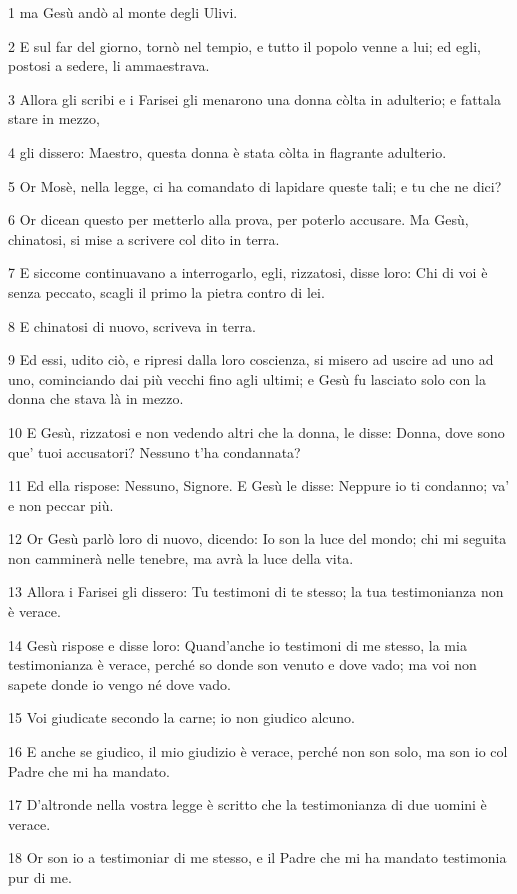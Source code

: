 \par 1 ma Gesù andò al monte degli Ulivi.
\par 2 E sul far del giorno, tornò nel tempio, e tutto il popolo venne a lui; ed egli, postosi a sedere, li ammaestrava.
\par 3 Allora gli scribi e i Farisei gli menarono una donna còlta in adulterio; e fattala stare in mezzo,
\par 4 gli dissero: Maestro, questa donna è stata còlta in flagrante adulterio.
\par 5 Or Mosè, nella legge, ci ha comandato di lapidare queste tali; e tu che ne dici?
\par 6 Or dicean questo per metterlo alla prova, per poterlo accusare. Ma Gesù, chinatosi, si mise a scrivere col dito in terra.
\par 7 E siccome continuavano a interrogarlo, egli, rizzatosi, disse loro: Chi di voi è senza peccato, scagli il primo la pietra contro di lei.
\par 8 E chinatosi di nuovo, scriveva in terra.
\par 9 Ed essi, udito ciò, e ripresi dalla loro coscienza, si misero ad uscire ad uno ad uno, cominciando dai più vecchi fino agli ultimi; e Gesù fu lasciato solo con la donna che stava là in mezzo.
\par 10 E Gesù, rizzatosi e non vedendo altri che la donna, le disse: Donna, dove sono que' tuoi accusatori? Nessuno t'ha condannata?
\par 11 Ed ella rispose: Nessuno, Signore. E Gesù le disse: Neppure io ti condanno; va' e non peccar più.
\par 12 Or Gesù parlò loro di nuovo, dicendo: Io son la luce del mondo; chi mi seguita non camminerà nelle tenebre, ma avrà la luce della vita.
\par 13 Allora i Farisei gli dissero: Tu testimoni di te stesso; la tua testimonianza non è verace.
\par 14 Gesù rispose e disse loro: Quand'anche io testimoni di me stesso, la mia testimonianza è verace, perché so donde son venuto e dove vado; ma voi non sapete donde io vengo né dove vado.
\par 15 Voi giudicate secondo la carne; io non giudico alcuno.
\par 16 E anche se giudico, il mio giudizio è verace, perché non son solo, ma son io col Padre che mi ha mandato.
\par 17 D'altronde nella vostra legge è scritto che la testimonianza di due uomini è verace.
\par 18 Or son io a testimoniar di me stesso, e il Padre che mi ha mandato testimonia pur di me.
